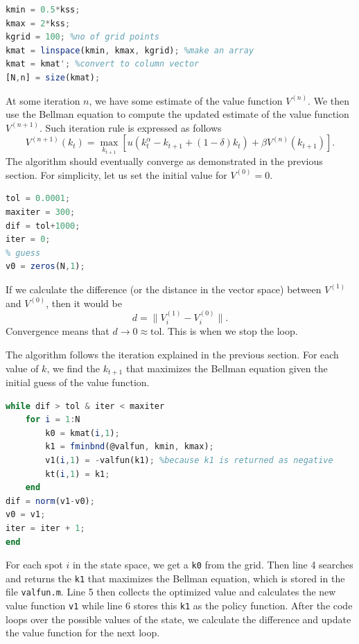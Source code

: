 \documentclass[10pt,a4paper]{article}
\begin{document}
\begin{lstlisting}[language=Octave]
% initiate grid 
kmin = 0.5*kss;
kmax = 2*kss;
kgrid = 100; %no of grid points
kmat = linspace(kmin, kmax, kgrid); %make an array
kmat = kmat'; %convert to column vector
[N,n] = size(kmat);
\end{lstlisting}


At some iteration $n$, we have some estimate of the value function $V^{(n)}$. We then use the Bellman equation to compute the updated estimate of the value function $V^{(n+1)}$. Such iteration rule is expressed as follows
\begin{equation}
	V^{(n+1)}(k_t) = \max_{k_{t+1}} \left[ u(k_t^\alpha - k_{t+1} + (1-\delta)k_t) + \beta V^{(n)}(k_{t+1})  \right].
\end{equation}
The algorithm should eventually converge as demonstrated in the previous section.
For simplicity, let us set the initial value for $V^{(0)} = 0$.

\begin{lstlisting}[language=Octave]
tol = 0.0001;
maxiter = 300;
dif = tol+1000;
iter = 0;
% guess
v0 = zeros(N,1);
\end{lstlisting}

If we calculate the difference (or the distance in the vector space) between $V^{(1)}$ and $V^{(0)}$, then it would be
\begin{equation}
	d = \| V^{(1)}_i - V^{(0)}_i \|.
\end{equation}
Convergence means that $d \to 0 \approx \text{tol}$. This is when we stop the loop. 

The algorithm follows the iteration explained in the previous section. For each value of $k$, we find the $k_{t+1}$ that maximizes the Bellman equation given the initial guess of the value function. 
\begin{lstlisting}[language=Octave]
while dif > tol & iter < maxiter
	for i = 1:N
		k0 = kmat(i,1);
		k1 = fminbnd(@valfun, kmin, kmax);
		v1(i,1) = -valfun(k1); %because k1 is returned as negative
		kt(i,1) = k1;
	end
dif = norm(v1-v0);
v0 = v1;
iter = iter + 1;
end
\end{lstlisting}

For each spot $i$ in the state space, we get a \verb|k0| from the grid. Then line 4 searches and returns the \verb|k1| that maximizes the Bellman equation, which is stored in the file \verb|valfun.m|. Line 5 then collects the optimized value and calculates the new value function \verb|v1| while line 6 stores this \verb|k1| as the policy function. After the code loops over the possible values of the state, we calculate the difference and update the value function for the next loop.
\end{document}
